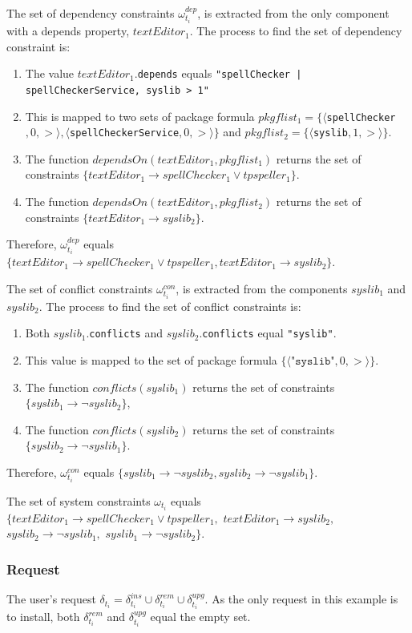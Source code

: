 The set of dependency  constraints $\omega_{t_i}^{dep}$, is extracted from the only component with a depends property, $textEditor_1$.
The process to find the set of dependency constraint is:
\begin{enumerate}
  \item The value $textEditor_1$.\texttt{depends} equals \texttt{"spellChecker | spellCheckerService, syslib > 1"}
  \item This is mapped to two sets of package formula $pkgflist_1 = \{\langle $\verb+spellChecker+$,0,>\rangle,\langle $\verb+spellCheckerService+$,0,>\rangle\}$ 
  and $pkgflist_2 = \{\langle $\verb+syslib+$,1,>\rangle\}$.
  \item The function $dependsOn(textEditor_1 , pkgflist_1 )$ returns the set of constraints $\{textEditor_1 \rightarrow spellChecker_1 \vee tpspeller_1\}$.
  \item The function $dependsOn(textEditor_1 , pkgflist_2)$ returns the set of constraints  $\{textEditor_1 \rightarrow syslib_2\}$.
\end{enumerate}
Therefore, $\omega_{t_i}^{dep}$ equals $\{textEditor_1 \rightarrow spellChecker_1 \vee tpspeller_1 , textEditor_1 \rightarrow syslib_2\}$.

The set of conflict  constraints $\omega_{t_i}^{con}$, is extracted from the components $syslib_1$ and $syslib_2$.
The process to find the set of conflict constraints is:
\begin{enumerate}
  \item Both $syslib_1$.\texttt{conflicts} and $syslib_2$.\texttt{conflicts} equal \texttt{"syslib"}.
  \item This value is mapped to the set of package formula $\{\langle \texttt{"syslib"}, 0 , >\rangle\}$.
  \item The function $conflicts(syslib_1)$ returns the set of constraints $\{syslib_1 \rightarrow \neg syslib_2\}$,
  \item The function $conflicts(syslib_2)$ returns the set of constraints $\{syslib_2 \rightarrow \neg syslib_1\}$.
\end{enumerate}
Therefore, $\omega_{t_i}^{con}$ equals $\{syslib_1 \rightarrow \neg syslib_2, syslib_2 \rightarrow \neg syslib_1\}$.

The set of system constraints $\omega_{t_i}$ equals
$\{ textEditor_1 \rightarrow spellChecker_1 \vee tpspeller_1,$ 
$textEditor_1 \rightarrow syslib_2,$ 
$syslib_2 \rightarrow \neg syslib_1,$   
$syslib_1 \rightarrow \neg syslib_2\}$.

\subsubsection{Request}
The user's request $\delta_{t_i} =  \delta_{t_i}^{ins} \cup \delta_{t_i}^{rem} \cup \delta_{t_i}^{upg}$.
As the only request in this example is to install, both $\delta_{t_i}^{rem}$ and $\delta_{t_i}^{upg}$ equal the empty set.

